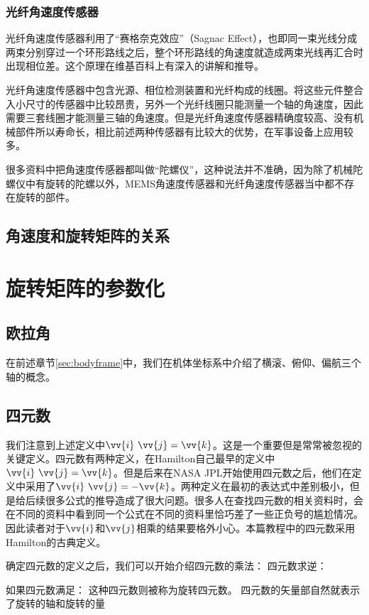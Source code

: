 \documentclass[11pt]{article}
\begin{document}
\subsubsection{光纤角速度传感器}
光纤角速度传感器利用了“赛格奈克效应”（Sagnac Effect），也即同一束光线分成两束分别穿过一个环形路线之后，整个环形路线的角速度就造成两束光线再汇合时出现相位差。这个原理在维基百科上有深入的讲解和推导。

光纤角速度传感器中包含光源、相位检测装置和光纤构成的线圈。将这些元件整合入小尺寸的传感器中比较昂贵，另外一个光纤线圈只能测量一个轴的角速度，因此需要三套线圈才能测量三轴的角速度。但是光纤角速度传感器精确度较高、没有机械部件所以寿命长，相比前述两种传感器有比较大的优势，在军事设备上应用较多。



很多资料中把角速度传感器都叫做“陀螺仪”，这种说法并不准确，因为除了机械陀螺仪中有旋转的陀螺以外，MEMS角速度传感器和光纤角速度传感器当中都不存在旋转的部件。

\subsection{角速度和旋转矩阵的关系}
\section{旋转矩阵的参数化}
\subsection{欧拉角}
在前述章节\ref{sec:bodyframe}中，我们在机体坐标系中介绍了横滚、俯仰、偏航三个轴的概念。
\subsection{四元数}
我们注意到上述定义中$\vv{i}\ \vv{j}=\vv{k}$。这是一个重要但是常常被忽视的关键定义。四元数有两种定义，在Hamilton自己最早的定义中$\vv{i}\ \vv{j}=\vv{k}$。但是后来在NASA JPL开始使用四元数之后，他们在定义中采用了$\vv{i}\ \vv{j}=-\vv{k}$。两种定义在最初的表达式中差别极小，但是给后续很多公式的推导造成了很大问题。很多人在查找四元数的相关资料时，会在不同的资料中看到同一个公式在不同的资料里恰巧差了一些正负号的尴尬情况。因此读者对于$\vv{i}$和$\vv{j}$相乘的结果要格外小心。本篇教程中的四元数采用Hamilton的古典定义。

确定四元数的定义之后，我们可以开始介绍四元数的乘法：
四元数求逆：

如果四元数满足：
这种四元数则被称为旋转四元数。
四元数的矢量部自然就表示了旋转的轴和旋转的量
\end{document}
